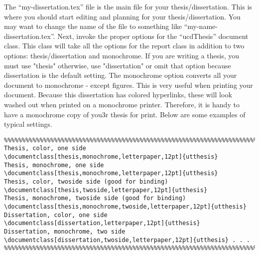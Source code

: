 The ``my-dissertation.tex'' file is the main file for your thesis/dissertation. This is where you should start editing and planning for your thesis/dissertation. You may want to change the name of the file to something like ``my-name-dissertation.tex''. Next, invoke the proper options for the ``ucdThesis'' document class. This class will take all the options for the report class in addition to two options: thesis/dissertation and monochrome. If you are writing a thesis, you must use "thesis" otherwise, use "dissertation" or omit that option because dissertation is the default setting. The monochrome option converts all your document to monochrome - except figures. This is very useful when printing your document. Because this dissertation has colored hyperlinks, these will look washed out when printed on a monochrome printer. Therefore, it is handy to have a monochrome copy of you3r thesis for print. Below are some examples of typical settings.
\begin{verbatim}
%%%%%%%%%%%%%%%%%%%%%%%%%%%%%%%%%%%%%%%%%%%%%%%%%%%%%%%%%%%%%%%%%%%%%%%%%%%
Thesis, color, one side
\documentclass[thesis,monochrome,letterpaper,12pt]{utthesis}
Thesis, monochrome, one side
\documentclass[thesis,monochrome,letterpaper,12pt]{utthesis}
Thesis, color, twoside side (good for binding)
\documentclass[thesis,twoside,letterpaper,12pt]{utthesis}
Thesis, monochrome, twoside side (good for binding)
\documentclass[thesis,monochrome,twoside,letterpaper,12pt]{utthesis}
Dissertation, color, one side
\documentclass[dissertation,letterpaper,12pt]{utthesis}
Dissertation, monochrome, two side
\documentclass[dissertation,twoside,letterpaper,12pt]{utthesis} . . .
%%%%%%%%%%%%%%%%%%%%%%%%%%%%%%%%%%%%%%%%%%%%%%%%%%%%%%%%%%%%%%%%%%%%%%%%%%%
\end{verbatim}


